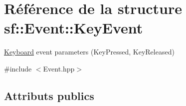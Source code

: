 \hypertarget{structsf_1_1Event_1_1KeyEvent}{}\section{Référence de la structure sf\+:\+:Event\+:\+:Key\+Event}
\label{structsf_1_1Event_1_1KeyEvent}


\hyperlink{classsf_1_1Keyboard}{Keyboard} event parameters (Key\+Pressed, Key\+Released)  




{\ttfamily \#include $<$Event.\+hpp$>$}

\subsection*{Attributs publics}
